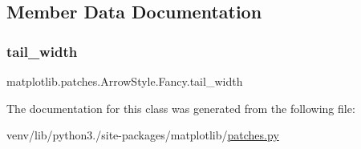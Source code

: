 \subsection{Member Data Documentation}
\mbox{\label{classmatplotlib_1_1patches_1_1ArrowStyle_1_1Fancy_abfed18076a9c8ad7ef9c2f0f83d0e755}} 
\subsubsection{\texorpdfstring{tail\+\_\+width}{tail\_width}}
{\footnotesize\ttfamily matplotlib.\+patches.\+Arrow\+Style.\+Fancy.\+tail\+\_\+width}



The documentation for this class was generated from the following file\+:\begin{DoxyCompactItemize}
\item 
venv/lib/python3./site-\/packages/matplotlib/\hyperlink{patches_8py}{patches.\+py}\end{DoxyCompactItemize}
